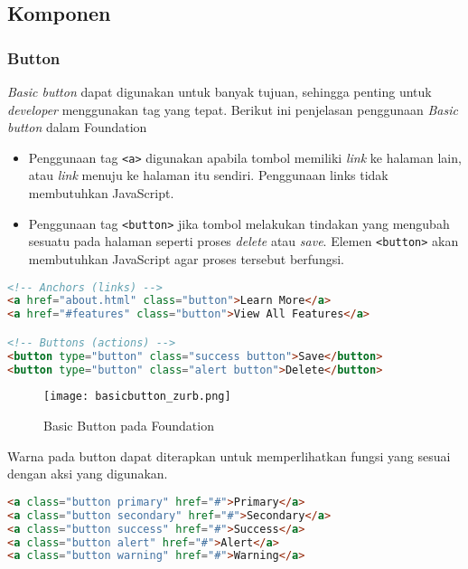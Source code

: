 \subsection{Komponen}

\subsubsection{Button}
\textit{Basic button} dapat digunakan untuk banyak tujuan, sehingga penting untuk \textit{developer} menggunakan tag yang tepat. Berikut ini penjelasan penggunaan \textit{Basic button} dalam Foundation
\begin{itemize}
	\item Penggunaan tag \texttt{<a>} digunakan apabila tombol memiliki \textit{link} ke halaman lain, atau \textit{link} menuju ke halaman itu sendiri. Penggunaan links tidak membutuhkan JavaScript.
	\item Penggunaan tag \texttt{<button>} jika tombol melakukan tindakan yang mengubah sesuatu pada halaman seperti proses \textit{delete} atau \textit{save}. Elemen \texttt{<button>} akan membutuhkan JavaScript agar proses tersebut berfungsi. 
\end{itemize}

\begin{lstlisting}[language=HTML,  basicstyle=\ttfamily, frame=single, columns=fullflexible, keepspaces=true, breaklines=true, showstringspaces=false, label={lst:buttonFoundation}, caption=Button pada foundation 6.] 
<!-- Anchors (links) -->
<a href="about.html" class="button">Learn More</a>
<a href="#features" class="button">View All Features</a>

<!-- Buttons (actions) -->
<button type="button" class="success button">Save</button>
<button type="button" class="alert button">Delete</button>
\end{lstlisting}

\begin{figure} [H]
	\centering  
	\texttt{[image: basicbutton\_zurb.png]}  
	\caption{Basic Button pada Foundation}
	\label{fig:buttonFoundation}
\end{figure}

\noindent Warna pada button dapat diterapkan untuk memperlihatkan fungsi yang sesuai dengan aksi yang digunakan.
\begin{lstlisting}[language=HTML,  basicstyle=\ttfamily, frame=single, columns=fullflexible, keepspaces=true, breaklines=true, showstringspaces=false, label={lst:basicButtonFoundation}, caption=Basic Button pada foundation 6.] 
<a class="button primary" href="#">Primary</a>
<a class="button secondary" href="#">Secondary</a>
<a class="button success" href="#">Success</a>
<a class="button alert" href="#">Alert</a>
<a class="button warning" href="#">Warning</a>
\end{lstlisting}

